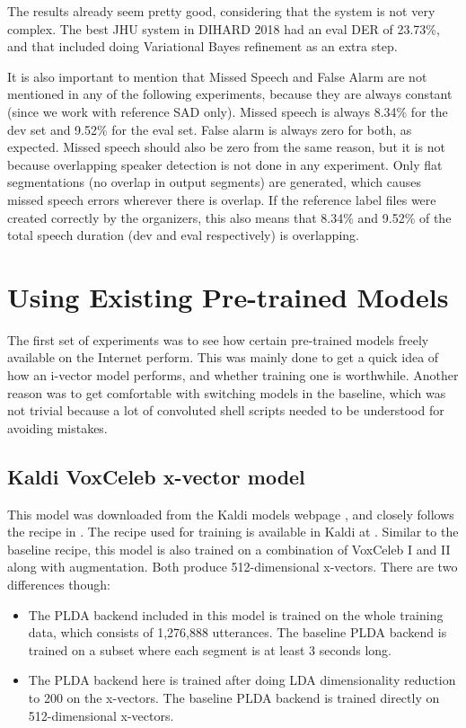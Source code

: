 	The results already seem pretty good, considering that the system is not very complex. The best JHU system in DIHARD 2018 had an eval DER of 23.73\%, and that included doing Variational Bayes refinement \cite{sell2015diarization} as an extra step.

	It is also important to mention that Missed Speech and False Alarm are not mentioned in any of the following experiments, because they are always constant (since we work with reference SAD only). Missed speech is always 8.34\% for the dev set and 9.52\% for the eval set. False alarm is always zero for both, as expected. Missed speech should also be zero from the same reason, but it is not because overlapping speaker detection is not done in any experiment. Only flat segmentations (no overlap in output segments) are generated, which causes missed speech errors wherever there is overlap. If the reference label files were created correctly by the organizers, this also means that 8.34\% and 9.52\% of the total speech duration (dev and eval respectively) is overlapping.
	
	\section{Using Existing Pre-trained Models}
	The first set of experiments was to see how certain pre-trained models freely available on the Internet perform. This was mainly done to get a quick idea of how an i-vector model performs, and whether training one is worthwhile. Another reason was to get comfortable with switching models in the baseline, which was not trivial because a lot of convoluted shell scripts needed to be understood for avoiding mistakes.
	
		\subsection{Kaldi VoxCeleb x-vector model}
			This model was downloaded from the Kaldi models webpage \cite{kaldi_models_webpage}, and closely follows the recipe in \cite{snyder2018x}. The recipe used for training is available in Kaldi at . Similar to the baseline recipe, this model is also trained on a combination of VoxCeleb I and II along with augmentation. Both produce 512-dimensional x-vectors. There are two differences though:
			\begin{itemize}
				\item The PLDA backend included in this model is trained on the whole training data, which consists of 1,276,888 utterances. The baseline PLDA backend is trained on a subset where each segment is at least 3 seconds long.
				\item The PLDA backend here is trained after doing LDA dimensionality reduction to 200 on the x-vectors. The baseline PLDA backend is trained directly on 512-dimensional x-vectors.
			\end{itemize}
			
